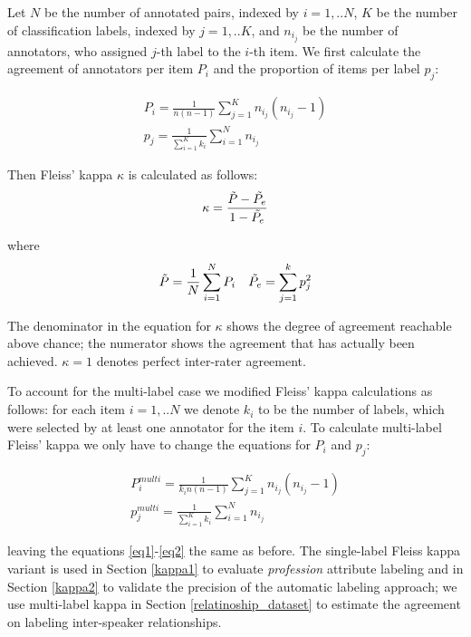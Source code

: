 Let $N$ be the number of annotated pairs, indexed by $i=1,..N$, $K$ be the number of classification labels, indexed by $j=1,..K$, and $n_i_j$ be the number of annotators, who assigned $j$-th label to the $i$-th item. We first calculate the agreement of annotators per item $P_i$ and the proportion of items per label $p_j$: \vspace{-1cm}
\begin{spreadlines}{20pt}
\begin{gather*}
    P_i = \frac{1}{n (n-1)} \sum_{j=1}^K n_i_j(n_i_j - 1) \\  
    p_j = \frac{1}{\sum_{i=1}^K k_i} \sum_{i=1}^N n_i_j
\end{gather*}
\end{spreadlines}

Then Fleiss' kappa $\kappa$ is calculated as follows:
\begin{align}
    \kappa = \frac{\Tilde{P} - \Tilde{P_e}}{1 - \Tilde{P_e}}
    \label{eq1}
\end{align}

where
\begin{align} \Tilde{P} = \frac{1}{N} \sum_{i=1}^N P_i &&
    \Tilde{P_e} = \sum_{j=1}^k p_j^2
    \label{eq2}
\end{align}

The denominator in the equation for $\kappa$ shows the degree of agreement reachable above chance; the numerator shows the agreement that has actually been achieved. $\kappa = 1$ denotes perfect inter-rater agreement.

To account for the multi-label case we modified Fleiss' kappa calculations as follows: for each item $i=1,..N$ we denote $k_i$ to be  the number of labels, which were selected by at least one annotator for the item $i$. To calculate multi-label Fleiss' kappa we only have to change the equations for $P_i$ and $p_j$:

\begin{gather}
    P^{multi}_i = \frac{1}{k_i n (n-1)} \sum_{j=1}^K n_i_j(n_i_j - 1) \\
    p^{multi}_j = \frac{1}{\sum_{i=1}^K k_i} \sum_{i=1}^N n_i_j
\end{gather}

leaving the equations \ref{eq1}-\ref{eq2} the same as before. The single-label Fleiss kappa variant is used in Section \ref{kappa1} to evaluate \textit{profession} attribute labeling and in Section \ref{kappa2} to validate the precision of the automatic labeling approach; we use multi-label kappa in Section \ref{relatinoship_dataset} to estimate the agreement on labeling inter-speaker relationships.